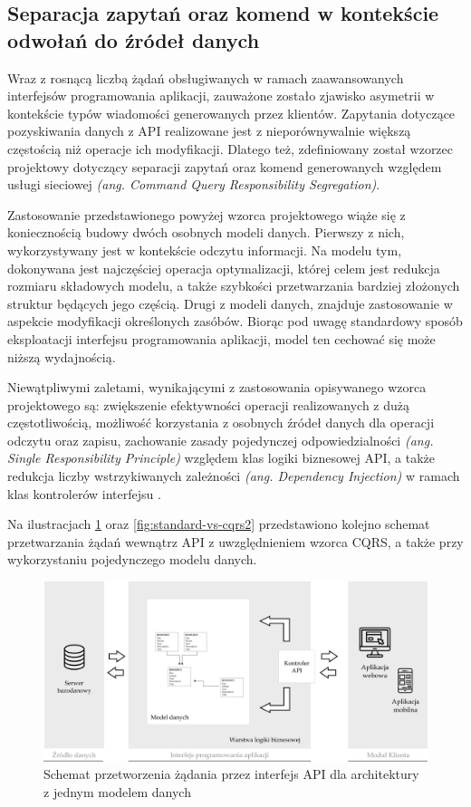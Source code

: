 \subsection*{Separacja zapytań oraz komend w kontekście odwołań do źródeł danych}
Wraz z rosnącą liczbą żądań obsługiwanych w ramach zaawansowanych interfejsów programowania aplikacji, zauważone zostało zjawisko asymetrii w kontekście typów wiadomości generowanych przez klientów. Zapytania dotyczące pozyskiwania danych z API realizowane jest z nieporównywalnie większą częstością niż operacje ich modyfikacji. Dlatego też, zdefiniowany został wzorzec projektowy dotyczący separacji zapytań oraz komend generowanych względem usługi sieciowej \textit{(ang. Command Query Responsibility Segregation)}.

Zastosowanie przedstawionego powyżej wzorca projektowego wiąże się z koniecznością budowy dwóch osobnych modeli danych. Pierwszy z nich, wykorzystywany jest w kontekście odczytu informacji. Na modelu tym, dokonywana jest najczęściej operacja optymalizacji, której celem jest redukcja rozmiaru składowych modelu, a także szybkości przetwarzania bardziej złożonych struktur będących jego częścią. Drugi z modeli danych, znajduje zastosowanie w aspekcie modyfikacji określonych zasóbów. Biorąc pod uwagę standardowy sposób eksploatacji interfejsu programowania aplikacji, model ten cechować się może niższą wydajnością.  

Niewątpliwymi zaletami, wynikającymi z zastosowania opisywanego wzorca projektowego są: zwiększenie efektywności operacji realizowanych z dużą częstotliwością, możliwość korzystania z osobnych źródeł danych dla operacji odczytu oraz zapisu, zachowanie zasady pojedynczej odpowiedzialności \textit{(ang. Single Responsibility Principle)} względem klas logiki biznesowej API, a także redukcja liczby wstrzykiwanych zależności \textit{(ang. Dependency Injection)} w ramach klas kontrolerów interfejsu \cite{cs7194}.

Na ilustracjach \ref{fig:standard-vs-cqrs1} oraz \ref{fig:standard-vs-cqrs2} przedstawiono kolejno schemat przetwarzania żądań wewnątrz API z uwzględnieniem wzorca CQRS, a także przy wykorzystaniu pojedynczego modelu danych.

\begin{figure}[ht]
    \centering
     \includegraphics[width=0.9\linewidth]{rys02/standard-vs-cqrs1.png}
    \caption{Schemat przetworzenia żądania przez interfejs API dla architektury z jednym modelem danych}
    \label{fig:standard-vs-cqrs1}
   \end{figure}

